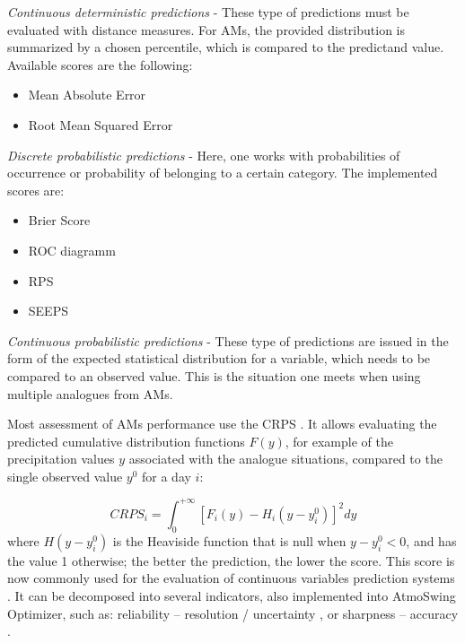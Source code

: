 \documentclass[review]{elsarticle}
\begin{document}
\textit{Continuous deterministic predictions} - These type of predictions must be evaluated with distance measures. For AMs, the provided distribution is summarized by a chosen percentile, which is compared to the predictand value. Available scores are the following:

\begin{itemize}
	\item Mean Absolute Error
	\item Root Mean Squared Error
\end{itemize}


\textit{Discrete probabilistic predictions} - Here, one works with probabilities of occurrence or probability of belonging to a certain category. The implemented scores are:

\begin{itemize}
	\item Brier Score \citep{Brier1950}
	\item ROC diagramm \citep[Relative Operating Characteristic or Receiver Operating Characteristic,][]{Mason1982}
	\item RPS \citep[Ranked Probability Score,][]{Epstein1969}
	\item SEEPS \citep[Stable Equitable Error in Probability Space,][]{Rodwell2010,Rodwell2011}
\end{itemize}


\textit{Continuous probabilistic predictions} - These type of predictions are issued in the form of the expected statistical distribution for a variable, which needs to be compared to an observed value. This is the situation one meets when using multiple analogues from AMs.

Most assessment of AMs performance use the CRPS \citep[Continuous Ranked Probability Score,][]{Brown1974, Matheson1976, Hersbach2000}. It allows evaluating the predicted cumulative distribution functions $F(y)$, for example of the precipitation values $y$ associated with the analogue situations, compared to the single observed value $y^{0}$ for a day $i$:

\begin{equation}
\label{eq:CRPS}
CRPS_{i} = \int_{0}^{+\infty} \left[ F_{i}(y)-H_{i}(y-y_{i}^{0})\right]^{2} dy
\end{equation}
where $H(y-y_{i}^{0})$ is the Heaviside function that is null when $y-y_{i}^{0}<0$, and has the value 1 otherwise; the better the prediction, the lower the score. This score is now commonly used for the evaluation of continuous variables prediction systems \citep{Casati2008, Marty2010}. It can be decomposed into several indicators, also implemented into AtmoSwing Optimizer, such as: reliability -- resolution / uncertainty \citep{Hersbach2000}, or sharpness -- accuracy \citep{Bontron2004}.
\end{document}
